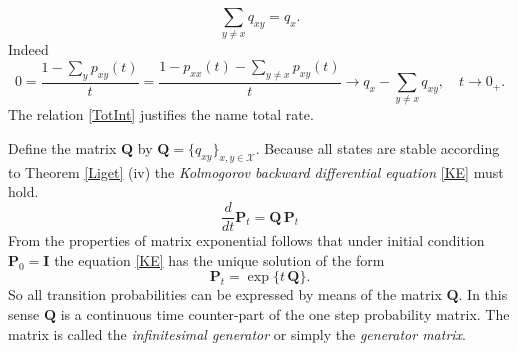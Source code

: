 \begin{equation}
\label{TotInt}
\sum_{y\neq x}q_{xy}=q_x.
\end{equation}
Indeed
\[0=\frac{1-\sum_y p_{xy}(t)}{t}=\frac{1-p_{xx}(t)-\sum_{y\neq x} p_{xy}(t)}{t}\longrightarrow q_x-\sum_{y\neq x}q_{xy}, \quad t\longrightarrow 0_+.\]
The relation \eqref{TotInt} justifies the name total rate. 

Define the matrix $\bm{Q}$ by $\bm{Q}=\{q_{xy}\}_{x,y\in\mathcal{X}}$. Because all states are stable according to Theorem \ref{Liget} (iv) the {\em Kolmogorov backward differential equation} \eqref{KE} must hold.
\begin{equation}
\label{KE}
\frac{d}{dt}\bm{P}_t=\bm{Q}\,\bm{P}_t 
\end{equation}
From the properties of matrix exponential follows that under initial condition $\bm{P}_0=\bm{I}$ the equation \eqref{KE} has the unique solution of  the form
\begin{equation}
\label{InfGen}
\bm{P}_t=\exp\{t\,\bm{Q}\}.
\end{equation} 
So all transition probabilities can be expressed by means of the matrix $\bm{Q}$. In this sense $\bm{Q}$ is a continuous time counter-part of the one step probability matrix. The matrix  is called the {\em infinitesimal generator} or simply the {\em generator matrix}.




